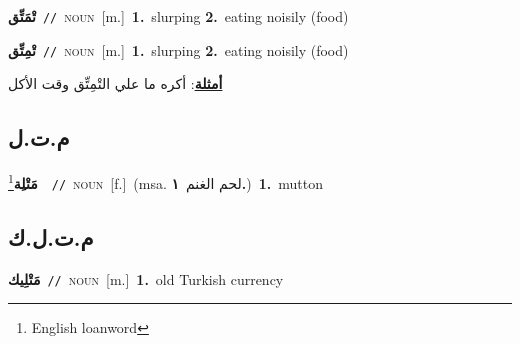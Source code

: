 \documentclass[10pt,a4paper,twoside]{article} %
\begin{document}
\begin{multicols}{2}
{\setlength\topsep{0pt}\textbf{\foreignlanguage{arabic}{تْمَتِّق}}\ {\color{gray}\texttt{//}\color{black}}\ \textsc{noun}\ [m.]\ \textbf{1.}~slurping  \textbf{2.}~eating noisily (food)\ } \vspace{2mm}

{\setlength\topsep{0pt}\textbf{\foreignlanguage{arabic}{تْمِتِّق}}\ {\color{gray}\texttt{//}\color{black}}\ \textsc{noun}\ [m.]\ \textbf{1.}~slurping  \textbf{2.}~eating noisily (food)\  \begin{flushright}\color{gray}\foreignlanguage{arabic}{\textbf{\underline{\foreignlanguage{arabic}{أمثلة}}}: أكره ما علي التْمِتِّق وقت الأكل}\end{flushright}\color{black}} \vspace{2mm}

\vspace{-3mm}
\subsection*{\color{blue}\foreignlanguage{arabic}{م.ت.ل}\color{blue}{}} 

{\setlength\topsep{0pt}\textbf{\foreignlanguage{arabic}{مَتْلِة}}\footnote{English loanword}\ \ {\color{gray}\texttt{//}\color{black}}\ \textsc{noun}\ [f.]\ \color{gray}(msa. \foreignlanguage{arabic}{لحم الغنم}~\foreignlanguage{arabic}{\textbf{١.}})\color{black}\ \textbf{1.}~mutton\ } \vspace{2mm}

\vspace{-3mm}
\subsection*{\color{blue}\foreignlanguage{arabic}{م.ت.ل.ك}\color{blue}{}} 

{\setlength\topsep{0pt}\textbf{\foreignlanguage{arabic}{مَتْلِيك}}\ {\color{gray}\texttt{//}\color{black}}\ \textsc{noun}\ [m.]\ \textbf{1.}~old Turkish currency\ } \vspace{2mm}


\end{multicols}
\end{document}
